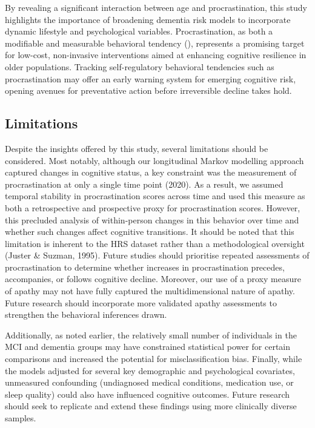 \documentclass[
]{article}
\begin{document}
By revealing a significant interaction between age and procrastination,
this study highlights the importance of broadening dementia risk models
to incorporate dynamic lifestyle and psychological variables.
Procrastination, as both a modifiable and measurable behavioral tendency
(), represents
a promising target for low-cost, non-invasive interventions aimed at
enhancing cognitive resilience in older populations. Tracking
self-regulatory behavioral tendencies such as procrastination may offer
an early warning system for emerging cognitive risk, opening avenues for
preventative action before irreversible decline takes hold.

\subsection{Limitations}\label{limitations}

Despite the insights offered by this study, several limitations should
be considered. Most notably, although our longitudinal Markov modelling
approach captured changes in cognitive status, a key constraint was the
measurement of procrastination at only a single time point (2020). As a
result, we assumed temporal stability in procrastination scores across
time and used this measure as both a retrospective and prospective proxy
for procrastination scores. However, this precluded analysis of
within-person changes in this behavior over time and whether such
changes affect cognitive transitions. It should be noted that this
limitation is inherent to the HRS dataset rather than a methodological
oversight (Juster \& Suzman, 1995). Future studies should prioritise
repeated assessments of procrastination to determine whether increases
in procrastination precedes, accompanies, or follows cognitive decline.
Moreover, our use of a proxy measure of apathy may not have fully
captured the multidimensional nature of apathy. Future research should
incorporate more validated apathy assessments to strengthen the
behavioral inferences drawn.

Additionally, as noted earlier, the relatively small number of
individuals in the MCI and dementia groups may have constrained
statistical power for certain comparisons and increased the potential
for misclassification bias. Finally, while the models adjusted for
several key demographic and psychological covariates, unmeasured
confounding (undiagnosed medical conditions, medication use, or sleep
quality) could also have influenced cognitive outcomes. Future research
should seek to replicate and extend these findings using more clinically
diverse samples.
\end{document}
